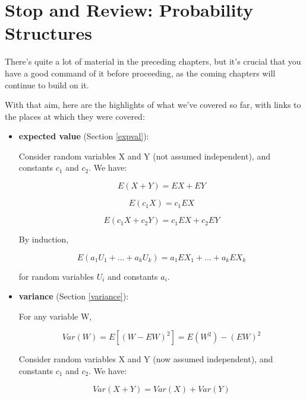 \chapter{Stop and Review:  Probability Structures}
\label{stopandreview}

There's quite a lot of material in the preceding chapters, but it's
crucial that you have a good command of it before proceeding, as the
coming chapters will continue to build on it.

With that aim, here are the highlights of what we've covered so far,
with links to the places at which they were covered:

\begin{itemize}

\item {\bf expected value} (Section \ref{expval}):

Consider random variables X and Y (not assumed independent), and 
constants $c_1$ and $c_2$.  We have:

\begin{equation}
E(X + Y) = EX + EY
\end{equation}

\begin{equation}
E(c_1 X) = c_1 EX
\end{equation}

\begin{equation}
E(c_1 X + c_2 Y) = c_1 EX + c_2 EY
\end{equation}

By induction,

\begin{equation}
E(a_1 U_1 + ... + a_k U_k) = a_1 EX_1 + ... + a_k EX_k
\end{equation}

for random variables $U_i$ and constants $a_i$.

\item {\bf variance} (Section \ref{variance}):

For any variable W,

\begin{equation}
Var(W) = E[(W - EW)^2] = E(W^2) - (EW)^2
\end{equation}

Consider random variables X and Y (now assumed independent), and 
constants $c_1$ and $c_2$.  We have:

\begin{equation}
Var(X+Y) = Var(X) + Var(Y)
\end{equation}


\end{itemize}
